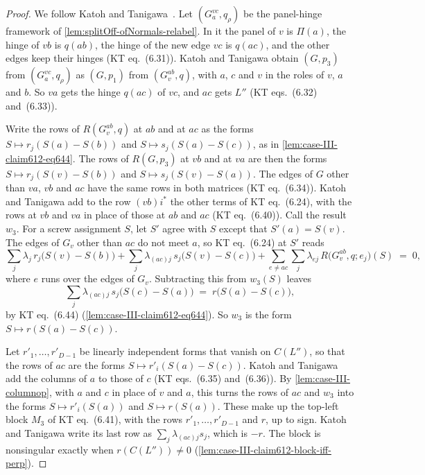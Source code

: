 \begin{proof}
  \leanok
  We follow Katoh and Tanigawa~\cite[pp.~686--689]{katohTanigawa2011}.
  Let $(G_a^{vc}, q_\rho)$ be the panel-hinge framework of
  \cref{lem:splitOff-ofNormals-relabel}. In it the panel of $v$ is
  $\Pi(a)$, the hinge of $vb$ is $q(ab)$, the hinge of the new edge $vc$
  is $q(ac)$, and the other edges keep their hinges (KT eq.~(6.31)).
  Katoh and Tanigawa obtain $(G, p_3)$ from $(G_a^{vc}, q_\rho)$ as
  $(G, p_1)$ from $(G_v^{ab}, q)$, with $a$, $c$ and $v$ in the roles of
  $v$, $a$ and $b$. So $va$ gets the hinge $q(ac)$ of $vc$, and $ac$ gets
  $L''$ (KT eqs.~(6.32) and~(6.33)).

  Write the rows of $R(G_v^{ab}, q)$ at $ab$ and at $ac$ as the forms
  $S \mapsto r_j(S(a) - S(b))$ and $S \mapsto s_j(S(a) - S(c))$, as in
  \cref{lem:case-III-claim612-eq644}. The rows of $R(G, p_3)$ at $vb$ and
  at $va$ are then the forms $S \mapsto r_j(S(v) - S(b))$ and
  $S \mapsto s_j(S(v) - S(a))$. The edges of $G$ other than $va$, $vb$
  and $ac$ have the same rows in both matrices (KT eq.~(6.34)). Katoh and
  Tanigawa add to the row $(vb)i^*$ the other terms of KT eq.~(6.24),
  with the rows at $vb$ and $va$ in place of those at $ab$ and $ac$ (KT
  eq.~(6.40)). Call the result $w_3$. For a screw assignment $S$, let
  $S'$ agree with $S$ except that $S'(a) = S(v)$. The edges of $G_v$
  other than $ac$ do not meet $a$, so KT eq.~(6.24) at $S'$ reads
  \[
    \sum_j \lambda_j\, r_j\bigl(S(v) - S(b)\bigr)
    + \sum_j \lambda_{(ac)j}\, s_j\bigl(S(v) - S(c)\bigr)
    + \sum_{e \neq ac} \sum_j \lambda_{ej}\, R\bigl(G_v^{ab}, q; e_j\bigr)(S)
    \;=\; 0 ,
  \]
  where $e$ runs over the edges of $G_v$. Subtracting this from $w_3(S)$
  leaves
  \[
    \sum_j \lambda_{(ac)j}\, s_j\bigl(S(c) - S(a)\bigr)
    \;=\; r\bigl(S(a) - S(c)\bigr),
  \]
  by KT eq.~(6.44) (\cref{lem:case-III-claim612-eq644}). So $w_3$ is the
  form $S \mapsto r(S(a) - S(c))$.

  Let $r'_1, \dots, r'_{D-1}$ be linearly independent forms that vanish
  on $C(L'')$, so that the rows of $ac$ are the forms
  $S \mapsto r'_i(S(a) - S(c))$. Katoh and Tanigawa add the columns of
  $a$ to those of $c$ (KT eqs.~(6.35) and~(6.36)). By
  \cref{lem:case-III-columnop}, with $a$ and $c$ in place of $v$ and $a$,
  this turns the rows of $ac$ and $w_3$ into the forms
  $S \mapsto r'_i(S(a))$ and $S \mapsto r(S(a))$. These make up the
  top-left block $M_3$ of KT eq.~(6.41), with the rows
  $r'_1, \dots, r'_{D-1}$ and $r$, up to sign. Katoh and Tanigawa write
  its last row as $\sum_j \lambda_{(ac)j} s_j$, which is $-r$. The block
  is nonsingular exactly when $r(C(L'')) \neq 0$
  (\cref{lem:case-III-claim612-block-iff-perp}).


\end{proof}

